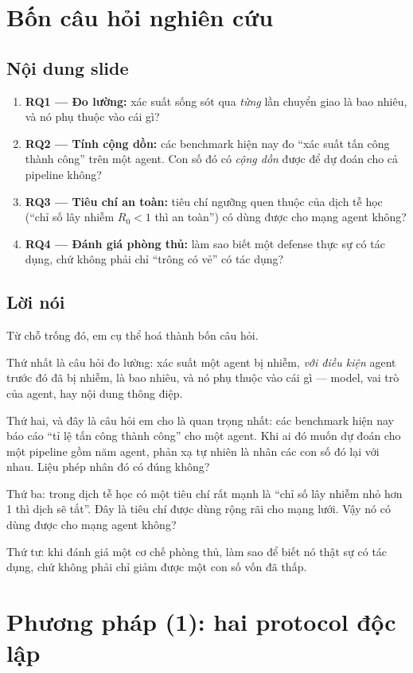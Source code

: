\documentclass[11pt,a4paper]{article}
\newcommand{\slide}[1]{\section{#1}}
\newcommand{\noidung}{\subsection*{Nội dung slide}}
\newcommand{\loinoi}{\subsection*{Lời nói}}
\begin{document}
\slide{Bốn câu hỏi nghiên cứu}

\noidung
\begin{enumerate}
  \item \textbf{RQ1 --- Đo lường:} xác suất sống sót qua \emph{từng} lần chuyển giao
        là bao nhiêu, và nó phụ thuộc vào cái gì?
  \item \textbf{RQ2 --- Tính cộng dồn:} các benchmark hiện nay đo ``xác suất tấn công
        thành công'' trên một agent. Con số đó có \emph{cộng dồn} được để dự đoán cho
        cả pipeline không?
  \item \textbf{RQ3 --- Tiêu chí an toàn:} tiêu chí ngưỡng quen thuộc của dịch tễ học
        (``chỉ số lây nhiễm $R_0 < 1$ thì an toàn'') có dùng được cho mạng agent không?
  \item \textbf{RQ4 --- Đánh giá phòng thủ:} làm sao biết một defense thực sự có tác
        dụng, chứ không phải chỉ ``trông có vẻ'' có tác dụng?
\end{enumerate}

\loinoi
Từ chỗ trống đó, em cụ thể hoá thành bốn câu hỏi.

Thứ nhất là câu hỏi đo lường: xác suất một agent bị nhiễm, \emph{với điều kiện} agent
trước đó đã bị nhiễm, là bao nhiêu, và nó phụ thuộc vào cái gì --- model, vai trò của
agent, hay nội dung thông điệp.

Thứ hai, và đây là câu hỏi em cho là quan trọng nhất: các benchmark hiện nay báo cáo
``tỉ lệ tấn công thành công'' cho một agent. Khi ai đó muốn dự đoán cho một pipeline
gồm năm agent, phản xạ tự nhiên là nhân các con số đó lại với nhau. Liệu phép nhân đó
có đúng không?

Thứ ba: trong dịch tễ học có một tiêu chí rất mạnh là ``chỉ số lây nhiễm nhỏ hơn 1 thì
dịch sẽ tắt''. Đây là tiêu chí được dùng rộng rãi cho mạng lưới. Vậy nó có dùng được
cho mạng agent không?

Thứ tư: khi đánh giá một cơ chế phòng thủ, làm sao để biết nó thật sự có tác dụng,
chứ không phải chỉ giảm được một con số vốn đã thấp.

\slide{Phương pháp (1): hai protocol độc lập}
\end{document}
